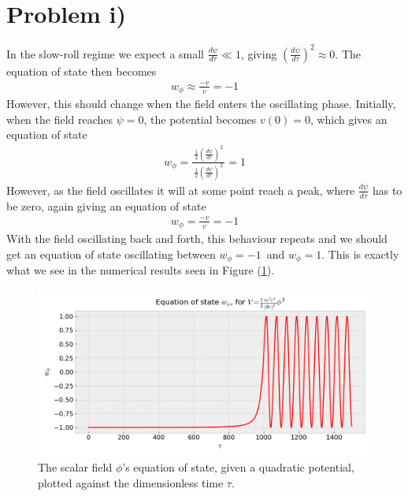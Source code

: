 \documentclass[reprint,english,notitlepage]{revtex4-1}  %
\numberwithin{equation}{section}
\begin{document}
\section{Problem i)}
In the slow-roll regime we expect a small $\frac{d\psi}{d\tau}\ll1$, giving
$\left(\frac{d\psi}{d\tau}\right)^2 \approx 0$. The equation of state then
becomes
\begin{align}
	w_\phi \approx \frac{-v}{v} = -1
\end{align}
However, this should change when the field enters the oscillating phase.
Initially, when the field reaches $\psi=0$, the potential becomes $v(0)=0$, which
gives an equation of state
\begin{align}
	w_\phi = \frac{\ \frac{1}{2}\left(\frac{d\psi}{d\tau}\right)^2 \ }{\frac{1}{2}\left(\frac{d\psi}{d\tau}\right)^2} = 1
\end{align}
However, as the field oscillates it will at some point reach a peak, where $\frac{d\psi}{d\tau}$
has to be zero, again giving an equation of state
\begin{align}
	w_\phi = \frac{-v}{v} = -1
\end{align}
With the field oscillating back and forth, this behaviour repeats and we should
get an equation of
state oscillating between $w_\phi=-1$ and $w_\phi=1$. This is exactly what we
see in the numerical results seen in Figure (\ref{fig:QuadraticPotential_field-eos}).
\begin{figure}[h!]
	\includegraphics[width=\linewidth]{QuadraticPotential_field-eos.png}
	\caption{The scalar field $\phi$'s equation of state, given a quadratic
	potential, plotted against the dimensionless time $\tau$.}
	\label{fig:QuadraticPotential_field-eos}
\end{figure}
\end{document}
